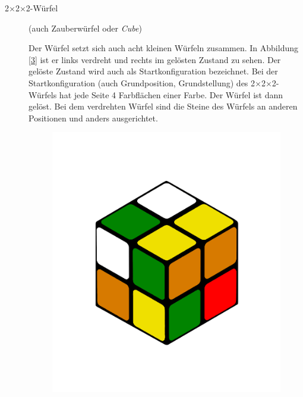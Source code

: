 \documentclass[12pt,a4paper, usenames, dvipsnames]{article}
\theoremstyle{mystyle}
\theoremstyle{definition}
\newcommand{\Ttwo}{2$\times$2$\times$2-}
\begin{document}
\begin{description}


\item[\Ttwo Würfel] (auch Zauberwürfel oder \textit{Cube}) 

Der Würfel setzt sich auch acht kleinen Würfeln zusammen.
In Abbildung \ref{3} ist er links verdreht und rechts im gelösten Zustand zu sehen. Der gelöste Zustand wird auch als Startkonfiguration bezeichnet.
Bei der Startkonfiguration (auch Grundposition, Grundstellung) des \Ttwo Würfels hat jede Seite 4 Farbflächen einer Farbe. Der Würfel ist dann gelöst.  
Bei dem verdrehten Würfel sind die Steine des Würfels an anderen Positionen und anders ausgerichtet.
\begin{figure}[h]
\centering
\includegraphics[scale=0.1]{2x2scrambled.png}

\end{figure}
\end{description}
\end{document}
